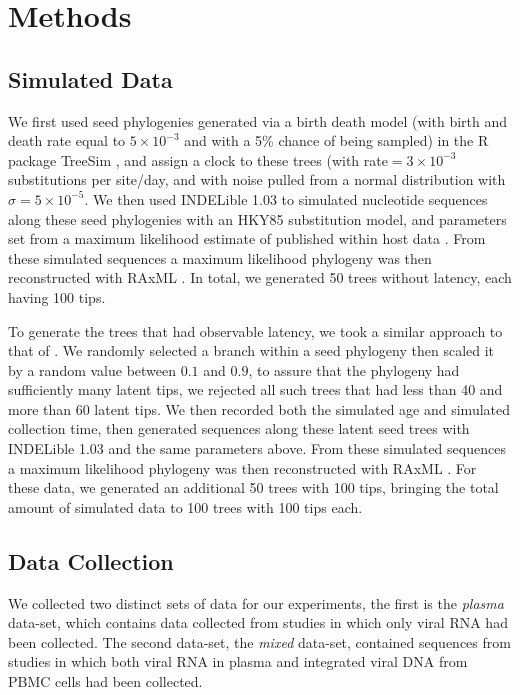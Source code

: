 \section{Methods} \label{sec:methods}
\subsection{Simulated Data} \label{subsec:simdata}
We first used seed phylogenies generated via a birth death model (with birth and death rate equal to $5\times 10^{-3}$ and with a 5\% chance of being sampled) in the R package TreeSim \citep{TreeSim, Stradler13, Boskova14}, and assign a clock to these trees (with rate$=3\times 10^{-3}$ substitutions per site/day, and with noise pulled from a normal distribution with $\sigma=5\times 10^{-5}$.
We then used INDELible 1.03 \citep{Indelible09} to simulated nucleotide sequences along these seed phylogenies with an HKY85 \citep{HKY85} substitution model, and  parameters set from a maximum likelihood estimate of published within host data \citep{McCloskey14}. 
From these simulated sequences a maximum likelihood phylogeny was then reconstructed with RAxML \citep{Raxml14}. In total, we generated 50 trees without latency, each having 100 tips. 

To generate the trees that had observable latency, we took a similar approach to that of \cite{Immonen14}. 
We randomly selected a branch within a seed phylogeny then scaled it by a random value between $0.1$ and $0.9$, to assure that the phylogeny had sufficiently many latent tips, we rejected all such trees that had less than 40 and more than 60 latent tips. 
We then recorded both the simulated age and simulated collection time, then generated sequences along these latent seed trees with INDELible 1.03 \citep{Indelible09} and the same parameters above. 
From these simulated sequences a maximum likelihood phylogeny was then reconstructed with RAxML \citep{Raxml14}.
For these data, we generated an additional 50 trees with 100 tips, bringing the total amount of simulated data to 100 trees with 100 tips each. 


\subsection{Data Collection} \label{subsec:dcollection}
We collected two distinct sets of data for our experiments, the first is the {\em plasma} data-set, which contains data collected from studies in which only viral RNA had been collected. 
The second data-set, the {\em mixed} data-set, contained sequences from studies in which both viral RNA in plasma and integrated viral DNA from PBMC cells had been collected.

